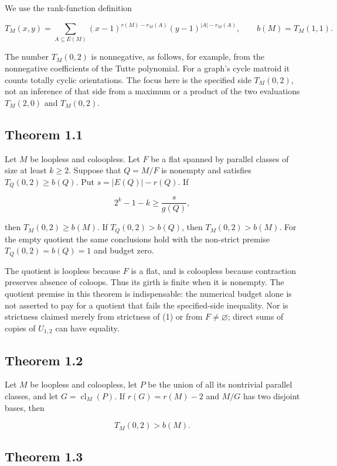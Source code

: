 \documentclass[11pt]{article}
\begin{document}
We use the rank-function definition

\[
T_M(x,y)=\sum_{A\subseteq E(M)}(x-1)^{r(M)-r_M(A)}(y-1)^{|A|-r_M(A)},
\qquad b(M)=T_M(1,1).
\]

The number \(T_M(0,2)\) is nonnegative, as follows, for example, from the nonnegative coefficients of the Tutte polynomial. For a graph's cycle matroid it counts totally cyclic orientations. The focus here is the specified side \(T_M(0,2)\), not an inference of that side from a maximum or a product of the two evaluations \(T_M(2,0)\) and \(T_M(0,2)\).

\subsection*{Theorem 1.1}

Let \(M\) be loopless and coloopless. Let \(F\) be a flat spanned by parallel classes of size at least \(k\ge2\). Suppose that \(Q=M/F\) is nonempty and satisfies \(T_Q(0,2)\ge b(Q)\). Put \(s=|E(Q)|-r(Q)\). If

\[
2^k-1-k\ge\frac{s}{g(Q)}, \tag{1}
\]

then \(T_M(0,2)\ge b(M)\). If \(T_Q(0,2)>b(Q)\), then \(T_M(0,2)>b(M)\). For the empty quotient the same conclusions hold with the non-strict premise \(T_Q(0,2)=b(Q)=1\) and budget zero.

The quotient is loopless because \(F\) is a flat, and is coloopless because contraction preserves absence of coloops. Thus its girth is finite when it is nonempty. The quotient premise in this theorem is indispensable: the numerical budget alone is not asserted to pay for a quotient that fails the specified-side inequality. Nor is strictness claimed merely from strictness of (1) or from \(F\ne\varnothing\); direct sums of copies of \(U_{1,2}\) can have equality.

\subsection*{Theorem 1.2}

Let \(M\) be loopless and coloopless, let \(P\) be the union of all its nontrivial parallel classes, and let \(G=\operatorname{cl}_M(P)\). If \(r(G)=r(M)-2\) and \(M/G\) has two disjoint bases, then

\[
T_M(0,2)>b(M). \tag{2}
\]

\subsection*{Theorem 1.3}
\end{document}
